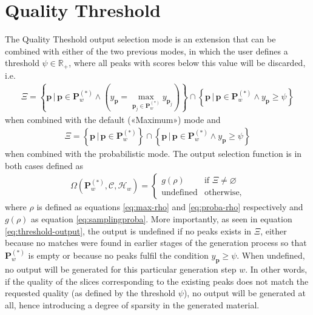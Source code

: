 \section{Quality Threshold}\label{ssec:qual-thresh}
The Quality Theshold output selection mode is an extension that can be combined with either of the two previous modes, in which the user defines a threshold $\psi \in \mathbb R_+$, where all peaks with scores below this value will be discarded, i.e.
	\begin{align}
		\Xi = \left\lbrace \bm p \,\bigg\vert	\, \bm p \in \bm P^{(\ast)}_w \wedge \left( y_{\bm p} = \max_{\bm p_j \in \bm P^{(\ast)}_w} y_{\bm p_j}\right)\right\rbrace
		\cap \left\lbrace \bm p \, \bigg\vert \, \bm p \in \bm P^{(\ast)}_w \wedge y_{\bm p} \ge \psi\right\rbrace
	\end{align}
	when combined with the default («Maximum») mode and 
	\begin{align}
		\Xi = \left\lbrace \bm p \, \bigg\vert \, \bm p \in \bm P^{(\ast)}_w\right\rbrace 
		\cap \left\lbrace \bm p \, \bigg\vert \, \bm p \in \bm P^{(\ast)}_w \wedge y_{\bm p} \ge \psi\right\rbrace
	\end{align}
	when combined with the probabilistic mode. The output selection function is in both cases defined as
	\begin{align}\label{eq:threshold-output}
		\Omega\left(\bm P^{(\ast)}_w, \mathcal C, \mathcal H_w\right) = \left\lbrace\begin{array}{ll}
				g(\rho) & \text{if } \Xi \ne \varnothing\\
				\text{undefined} & \text{otherwise},
			\end{array}\right.
	\end{align}
	where $\rho$ is defined as equations \ref{eq:max-rho} and \ref{eq:proba-rho} respectively and $g(\rho)$ as equation \ref{eq:samplingproba}. More importantly, as seen in equation \ref{eq:threshold-output}, the output is undefined if no peaks exists in $\Xi$, either because no matches were found in earlier stages of the generation process so that $\bm P^{(\ast)}_w$ is empty or because no peaks fulfil the condition $y_{\bm p} \ge \psi$. When undefined, no output will be generated for this particular generation step $w$. In other words, if the quality of the slices corresponding to the existing peaks does not match the requested quality (as defined by the threshold $\psi$), no output will be generated at all, hence introducing a degree of sparsity in the generated material.





